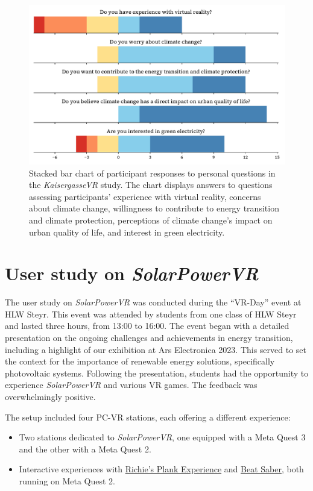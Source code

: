 \documentclass[draft, final]{vutinfth} %
\begin{document}
\begin{figure}[h]
    \centering
    \includegraphics[width=\textwidth]{graphics/participants-kaisergasse.pdf}
    \caption{Stacked bar chart of participant responses to personal questions in the \textit{KaisergasseVR} study. The chart displays answers to questions assessing participants' experience with virtual reality, concerns about climate change, willingness to contribute to energy transition and climate protection, perceptions of climate change's impact on urban quality of life, and interest in green electricity.}
    \label{fig:participants_kaisergasse}
\end{figure}

\section{User study on \textit{SolarPowerVR}}
The user study on \textit{SolarPowerVR} was conducted during the ``VR-Day'' event at HLW Steyr. This event was attended by students from one class of HLW Steyr and lasted three hours, from 13:00 to 16:00. The event began with a detailed presentation on the ongoing challenges and achievements in energy transition, including a highlight of our exhibition at Ars Electronica 2023. This served to set the context for the importance of renewable energy solutions, specifically photovoltaic systems. Following the presentation, students had the opportunity to experience \textit{SolarPowerVR} and various VR games. The feedback was overwhelmingly positive.

The setup included four PC-VR stations, each offering a different experience:
\begin{itemize}
    \item Two stations dedicated to \textit{SolarPowerVR}, one equipped with a Meta Quest 3 and the other with a Meta Quest 2.
    \item Interactive experiences with \hyperlink{https://store.steampowered.com/app/517160/Richies_Plank_Experience/}{Richie's Plank Experience} and \hyperlink{https://store.steampowered.com/app/620980/Beat_Saber/}{Beat Saber}, both running on Meta Quest 2.
\end{itemize}
\end{document}
